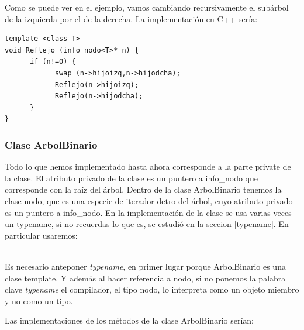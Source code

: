 \documentclass[10pt,a4paper,spanish]{report}
\begin{document}
\noindent
Como se puede ver en el ejemplo, vamos cambiando recursivamente el subárbol de la izquierda por el de la derecha. La implementación en C++ sería:

\begin{verbatim}
template <class T>
void Reflejo (info_nodo<T>* n) {
      if (n!=0) {
            swap (n->hijoizq,n->hijodcha);
            Reflejo(n->hijoizq);
            Reflejo(n->hijodcha);
      }
}
\end{verbatim}

\subsubsection{\textcolor[rgb]{0.3,0.4,0.8}Clase ArbolBinario}
\noindent
Todo lo que hemos implementado hasta ahora corresponde a la parte private de la clase. El atributo privado de la clase es un puntero a info\_nodo que corresponde con la raíz del árbol. Dentro de la clase ArbolBinario tenemos la clase nodo, que es una especie de iterador detro del árbol, cuyo atributo privado es un puntero a info\_nodo.
En la implementación de la clase se usa varias veces un typename, si no recuerdas lo que es, se estudió en la \hyperref[typename]{seccion \ref*{typename}}. En particular usaremos: \\ 
 
 {\centering{}\par}~\\ 

Es necesario anteponer  {\it typename}, en primer lugar porque ArbolBinario es una clase template. Y 
además al hacer referencia a nodo, si no ponemos la palabra clave {\it typename} el compilador, el tipo nodo,  lo interpreta como un objeto miembro y no como un tipo.

Las implementaciones de los métodos de la clase ArbolBinario serían:
\end{document}
